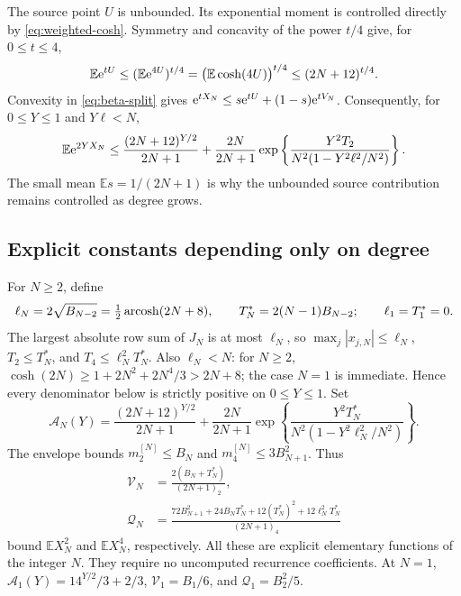 The source point \(U\) is unbounded. Its exponential moment is
controlled directly by \eqref{eq:weighted-cosh}. Symmetry and
concavity of the power \(t/4\) give, for \(0\le t\le4\),
\[
 \mathbb E\mathrm e^{tU}\le(\mathbb E\mathrm e^{4U})^{t/4}
 =\bigl(\mathbb E\cosh(4U)\bigr)^{t/4}\le(2N+12)^{t/4}.
\]
Convexity in \eqref{eq:beta-split} gives
\(\mathrm e^{tX_N}\le s\mathrm e^{tU}+(1-s)\mathrm e^{tV_N}\). Consequently,
for \(0\le Y\le1\) and \(Y\ell<N\),
\begin{equation}
 \mathbb E\mathrm e^{2YX_N}\le
 \frac{(2N+12)^{Y/2}}{2N+1}
 +\frac{2N}{2N+1}
 \exp\left\{\frac{Y^2T_2}{N^2(1-Y^2\ell^2/N^2)}\right\}.
 \label{eq:full-exponential}
\end{equation}
The small mean \(\mathbb E s=1/(2N+1)\) is why the unbounded
source contribution remains controlled as degree grows.

\subsection{Explicit constants depending only on degree}

For \(N\ge2\), define
\begin{equation}
 \ell_N=2\sqrt{B_{N-2}}=\tfrac12\operatorname{arcosh}(2N+8),\qquad
 T_N^*=2(N-1)B_{N-2};\qquad \ell_1=T_1^*=0.
 \label{eq:node-allowances}
\end{equation}
The largest absolute row sum of \(J_N\) is at most \(\ell_N\),
so \(\max_j|x_{j,N}|\le\ell_N\), \(T_2\le T_N^*\), and
\(T_4\le\ell_N^2T_N^*\). Also \(\ell_N<N\): for \(N\ge2\),
\(\cosh(2N)\ge1+2N^2+2N^4/3>2N+8\); the case \(N=1\)
is immediate. Hence every denominator below is strictly positive
on \(0\le Y\le1\). Set
\begin{equation}
 \mathcal A_N(Y)=\frac{(2N+12)^{Y/2}}{2N+1}
 +\frac{2N}{2N+1}
 \exp\left\{\frac{Y^2T_N^*}{N^2(1-Y^2\ell_N^2/N^2)}\right\}.
 \label{eq:A-budget}
\end{equation}
The envelope bounds \(m_2^{[N]}\le B_N\) and
\(m_4^{[N]}\le3B_{N+1}^2\). Thus
\begin{equation}
 \begin{aligned}
 \mathcal V_N&=\frac{2(B_N+T_N^*)}{(2N+1)_2},\\
 \mathcal Q_N&=\frac{72B_{N+1}^2+24B_NT_N^*+12(T_N^*)^2
                         +12\ell_N^2T_N^*}{(2N+1)_4}
 \end{aligned}
 \label{eq:moment-budgets}
\end{equation}
bound \(\mathbb E X_N^2\) and \(\mathbb E X_N^4\), respectively.
All these are explicit elementary functions of the integer \(N\).
They require no uncomputed recurrence coefficients. At \(N=1\),
\(\mathcal A_1(Y)=14^{Y/2}/3+2/3\),
\(\mathcal V_1=B_1/6\), and \(\mathcal Q_1=B_2^2/5\).

